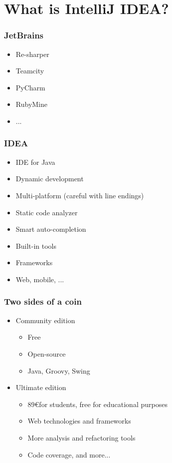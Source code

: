 \section{What is IntelliJ IDEA?}

\begin{frame}
\frametitle{JetBrains}
  \begin{itemize}
    \item Re-sharper
    \item Teamcity
    \item PyCharm
    \item RubyMine
    \item ...
  \end{itemize}
\end{frame}

\begin{frame}
\frametitle{IDEA}
  \begin{itemize}
    \item IDE for Java
    \item Dynamic development
    \item Multi-platform (careful with line endings)
    \item Static code analyzer
    \item Smart auto-completion
    \item Built-in tools
    \item Frameworks
    \item Web, mobile, ...
  \end{itemize}
\end{frame}

\begin{frame}
\frametitle{Two sides of a coin}
  \begin{itemize}
    \item Community edition
      \begin{itemize}
        \item Free
        \item Open-source
        \item Java, Groovy, Swing
      \end{itemize}
    \item Ultimate edition
      \begin{itemize}
        \item 89\euro for students, free for educational purposes
        \item Web technologies and frameworks
        \item More analysis and refactoring tools
        \item Code coverage, and more...
      \end{itemize}
  \end{itemize}
\end{frame}


